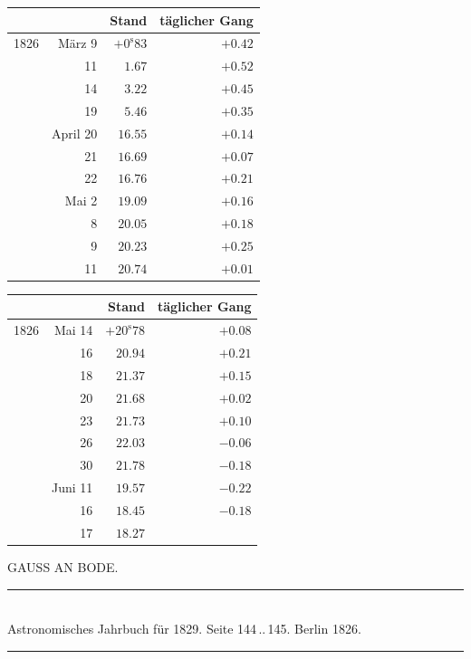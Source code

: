 \begin{center}
\begingroup\small\setlength{\tabcolsep}{5pt}
\begin{tabular}{lr|r|r}
 & & Stand & täglicher Gang \\
\hline
1826 & März 9 & $+0^{\mathrm s}83$ & $+0.42$ \\
 & 11 & $1.67$ & $+0.52$ \\
 & 14 & $3.22$ & $+0.45$ \\
 & 19 & $5.46$ & $+0.35$ \\
 & April 20 & $16.55$ & $+0.14$ \\
 & 21 & $16.69$ & $+0.07$ \\
 & 22 & $16.76$ & $+0.21$ \\
 & Mai 2 & $19.09$ & $+0.16$ \\
 & 8 & $20.05$ & $+0.18$ \\
 & 9 & $20.23$ & $+0.25$ \\
 & 11 & $20.74$ & $+0.01$ \\
\end{tabular}
\par\medskip
\begin{tabular}{lr|r|r}
 & & Stand & täglicher Gang \\
\hline
1826 & Mai 14 & $+20^{\mathrm s}78$ & $+0.08$ \\
 & 16 & $20.94$ & $+0.21$ \\
 & 18 & $21.37$ & $+0.15$ \\
 & 20 & $21.68$ & $+0.02$ \\
 & 23 & $21.73$ & $+0.10$ \\
 & 26 & $22.03$ & $-0.06$ \\
 & 30 & $21.78$ & $-0.18$ \\
 & Juni 11 & $19.57$ & $-0.22$ \\
 & 16 & $18.45$ & $-0.18$ \\
 & 17 & $18.27$ &  \\
\end{tabular}
\endgroup
\end{center}

\clearpage
{}
\hypertarget{native-459-bode}{}
\begin{center}{\large GAUSS AN BODE.}\end{center}

\begin{center}
\rule{0.55\linewidth}{0.4pt}\\[2pt]
Astronomisches Jahrbuch für 1829. Seite 144\,..\,145. Berlin 1826.\\[2pt]
\rule{0.55\linewidth}{0.4pt}
\end{center}

